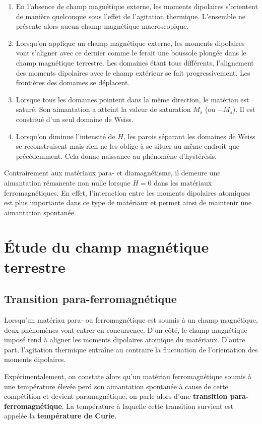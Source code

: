 \begin{enumerate}	
	\item En l'absence de champ magnétique externe,
          les moments dipolaires s'orientent de manière quelconque 
	  sous l'effet de l'agitation thermique. L'ensemble ne présente alors 
	  aucun champ magnétique macroscopique.

  	\item Lorsqu'on applique un champ magnétique externe, 
	  les moments dipolaires vont s'aligner avec ce dernier comme le ferait 
	  une boussole plongée dans le champ magnétique terrestre. 
	  Les domaines étant tous différents, l'alignement des moments
          dipolaires avec le champ extérieur se fait progressivement. Les frontières
	  des domaines se déplacent.
	  
	\item Lorsque tous les domaines pointent dans la même direction, 
	  le matériau est saturé. Son aimantation a atteint la valeur de saturation 
	  $M_s$ (ou $-M_s$). Il est constitué d'un seul domaine de Weiss.

	\item Lorsqu'on diminue l'intensité de $H$, les parois séparant les domaines de 
	Weiss se reconstruisent mais rien ne les oblige à se situer au même endroit que
	précédemment. Cela donne naissance au phénomène d'hystérésis.
\end{enumerate}
Contrairement aux matériaux para- et diamagnétisme, il demeure une aimantation 
rémanente non nulle lorsque $H = 0$ dans les matériaux ferromagnétiques. En effet,
l'interaction entre les moments dipolaires atomiques est plus importante dans ce
type de matériaux et permet ainsi de maintenir une aimantation spontanée.

\section{Étude du champ magnétique terrestre}
\subsection{Transition para-ferromagnétique}
Lorsqu'un matériau para- ou ferromagnétique est soumis à un champ magnétique,
deux phénomènes vont entrer en concurrence. D'un côté, le champ magnétique imposé
tend à aligner les moments dipolaires atomique du matériaux. D'autre part, l'agitation 
thermique entraîne au contraire la fluctuation de l'orientation des moments dipolaires.

Expérimentalement, on constate alors qu'un matériau ferromagnétique
soumis à une température
élevée perd son aimantation spontanée à cause de cette compétition et devient paramagnétique, 
on parle alors d'une \textbf{transition para- ferromagnétique}.
La température à laquelle cette transition survient est appelée la \textbf{température
de Curie}.

